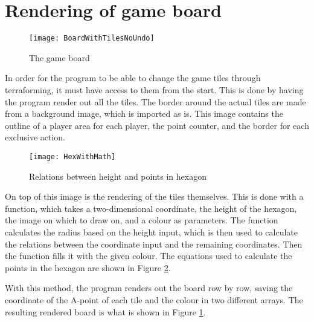 \section{Rendering of game board}
\begin{figure}[h!]
\centering \texttt{[image: BoardWithTilesNoUndo]}
\caption{The game board \label{Fig:Board}}
\end{figure}
In order for the program to be able to change the game tiles through terraforming, it must have access to them from the start. This is done by having the program render out all the tiles. The border around the actual tiles are made from a background image, which is imported as is. This image contains the outline of a player area for each player, the point counter, and the border for each exclusive action. 
\begin{figure}[h!]
\centering \texttt{[image: HexWithMath]}
\caption{Relations between height and points in hexagon \label{Fig:HexWithMath}}
\end{figure}

On top of this image is the rendering of the tiles themselves. This is done with a function, which takes a two-dimensional coordinate, the height of the hexagon, the image on which to draw on, and a colour as parameters. The function calculates the radius based on the height input, which is then used to calculate the relations between the coordinate input and the remaining coordinates. Then the function fills it with the given colour. The equations used to calculate the points in the hexagon are shown in Figure \ref{Fig:HexWithMath}.

With this method, the program renders out the board row by row, saving the coordinate of the A-point of each tile and the colour in two different arrays. The resulting rendered board is what is shown in Figure \ref{Fig:Board}.